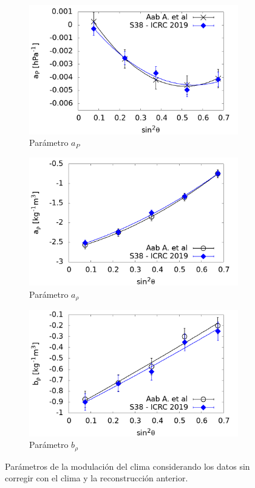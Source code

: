 				\begin{figure}[H]
    				\begin{subfigure}[b]{0.5\textwidth}
    				\includegraphics[width=\linewidth]{Graphs/params/ap_ICRC_2019_S38_above_0EeV.png}
					\caption{Parámetro $a_P$ }
					\label{fig:ap_2019_S38}
    				\end{subfigure}%
    				\hspace{\fill}
    				\begin{subfigure}[b]{0.5\textwidth}
    				\includegraphics[width=\linewidth]{Graphs/params/arho_ICRC_2019_S38_above_0EeV.png}
					\caption{Parámetro $a_{\rho}$ }
					\label{fig:arho_2019_S38}
    				\end{subfigure}%
    				\hspace{\fill}
    				\begin{subfigure}[b]{\textwidth}
    				\centering
    				\includegraphics[width=0.5\linewidth]{Graphs/params/brho_ICRC_2019_S38_above_0EeV.png}
					\caption{Parámetro  $b_{\rho}$	 }
					\label{fig:brho_2019_S38}
    				\end{subfigure}%
    				\caption{Parámetros de la modulación del clima considerando los datos sin corregir con el clima y la reconstrucción anterior.}\label{fig:parameters_new_S38}
				\end{figure}
